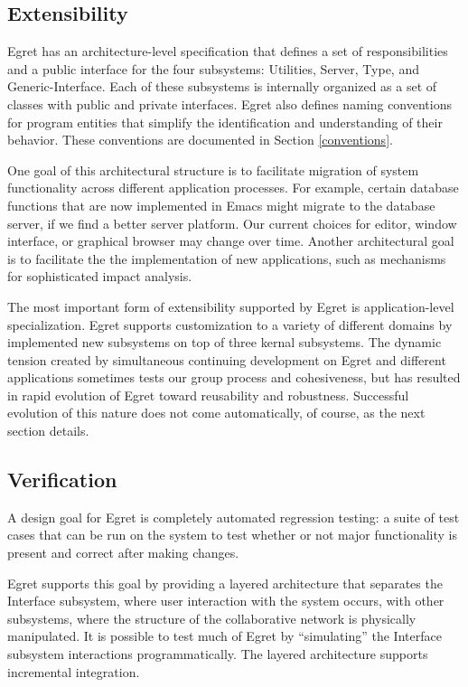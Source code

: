 \subsection{Extensibility}  

Egret has an architecture-level specification that defines a set of
responsibilities and a public interface for the four subsystems:
Utilities, Server, Type, and Generic-Interface.  Each of these subsystems is
internally organized as a set of classes with public and private
interfaces.  Egret also defines naming conventions for program
entities that simplify the identification and understanding of their
behavior.  These conventions are documented in Section
\ref{conventions}.

One goal of this architectural structure is to facilitate migration of
system functionality across different application processes.  For
example, certain database functions that are now implemented in Emacs
might migrate to the database server, if we find a better server
platform.  Our current choices for editor, window interface, or
graphical browser may change over time.  Another architectural goal is to
facilitate the the implementation of new applications, such as
mechanisms for sophisticated impact analysis.  

The most important form of extensibility supported by Egret is
application-level specialization.  Egret supports customization to a
variety of different domains by implemented new subsystems on top of
three kernal subsystems.  The dynamic tension created by simultaneous
continuing development on Egret and different applications sometimes
tests our group process and cohesiveness, but has resulted in rapid
evolution of Egret toward reusability and robustness. Successful
evolution of this nature does not come automatically, of course, as
the next section details.


\subsection{Verification} 

A design goal for Egret is completely automated regression testing: a
suite of test cases that can be run on the system to test whether or
not major functionality is present and correct after making changes.

Egret supports this goal by providing a layered architecture that
separates the Interface subsystem, where user interaction with the
system occurs, with other subsystems, where the structure of the
collaborative network is physically manipulated.  It is possible to
test much of Egret by ``simulating'' the Interface subsystem
interactions programmatically.  The layered architecture supports
incremental integration.

